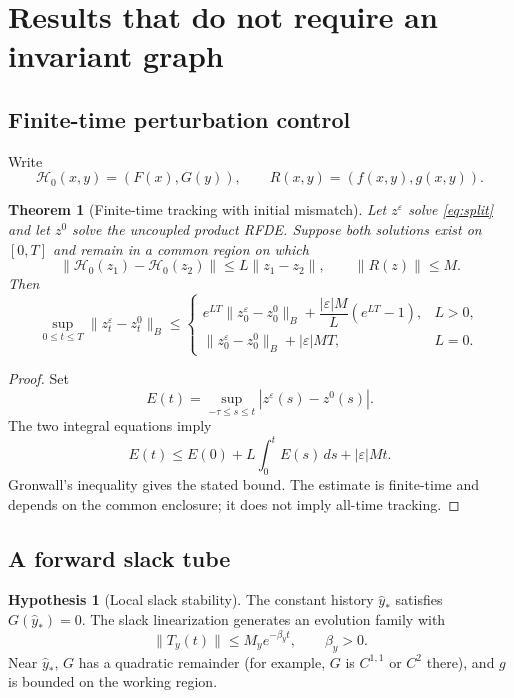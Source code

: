 \documentclass[11pt]{article}
\newtheorem{theorem}{Theorem}
\theoremstyle{definition}
\newtheorem{hypothesis}{Hypothesis}
\theoremstyle{remark}
\begin{document}
\section{Results that do not require an invariant graph}
\label{sec:proved}

\subsection{Finite-time perturbation control}

Write
\[
\mathcal H_0(x,y)=(F(x),G(y)),\qquad R(x,y)=(f(x,y),g(x,y)).
\]

\begin{theorem}[Finite-time tracking with initial mismatch]
\label{thm:track}
Let $z^\varepsilon$ solve \eqref{eq:split} and let $z^0$ solve the uncoupled product RFDE. Suppose both solutions exist on $[0,T]$ and remain in a common region on which
\[
\|\mathcal H_0(z_1)-\mathcal H_0(z_2)\|\le L\|z_1-z_2\|,
\qquad \|R(z)\|\le M.
\]
Then
\[
\sup_{0\le t\le T}\|z_t^\varepsilon-z_t^0\|_B
\le
\begin{cases}
 e^{LT}\|z_0^\varepsilon-z_0^0\|_B+
 \dfrac{|\varepsilon|M}{L}(e^{LT}-1),&L>0,\\[1.2ex]
 \|z_0^\varepsilon-z_0^0\|_B+|\varepsilon|MT,&L=0.
\end{cases}
\]
\end{theorem}

\begin{proof}
Set
\[
E(t)=\sup_{-\tau\le s\le t}|z^\varepsilon(s)-z^0(s)|.
\]
The two integral equations imply
\[
E(t)\le E(0)+L\int_0^tE(s)\,ds+|\varepsilon|Mt.
\]
Gronwall's inequality gives the stated bound. The estimate is finite-time and depends on the common enclosure; it does not imply all-time tracking.\qedhere
\end{proof}

\subsection{A forward slack tube}

\begin{hypothesis}[Local slack stability]
\label{hyp:slack}
The constant history $\widehat y_*$ satisfies $G(\widehat y_*)=0$. The slack linearization generates an evolution family with
\[
\|T_y(t)\|\le M_y e^{-\beta_y t},\qquad \beta_y>0.
\]
Near $\widehat y_*$, $G$ has a quadratic remainder (for example, $G$ is $C^{1,1}$ or $C^2$ there), and $g$ is bounded on the working region.
\end{hypothesis}
\end{document}

